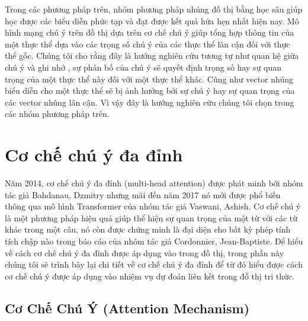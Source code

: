 Trong các phương pháp trên, nhóm phương pháp nhúng đồ thị bằng học sâu giúp học được các biểu diễn phức tạp và đạt được kết quả hứa hẹn nhất hiện nay. Mô hình mạng chú ý trên đồ thị dựa trên cơ chế chú ý giúp tổng hợp thông tin của một thực thể dựa vào các trọng số chú ý của các thực thể lân cận đối với thực thể gốc. Chúng tôi cho rằng đây là hướng nghiên cứu tương tự như quan hệ giữa chú ý và ghi nhớ \cite{memoryandattention:2020}, sự phân bố của chú ý sẽ quyết định trọng số hay sự quan trọng của một thực thể này đối với một thực thể khác. Cũng như vector nhúng biểu diễn cho một thực thể sẽ bị ảnh hưởng bởi sự chú ý hay sự quan trọng của các vector nhúng lân cận. Vì vậy đây là hướng nghiên cứu chúng tôi chọn trong các nhóm phương pháp trên.


\section{Cơ chế chú ý đa đỉnh}

Năm 2014, cơ chế chú ý đa đỉnh (multi-head attention) được phát minh bởi nhóm tác giả Bahdanau, Dzmitry\cite{bahdanau2014neural} nhưng mãi đến năm 2017 nó mới được phổ biến thông qua mô hình Transformer của nhóm tác giả Vaswani, Ashish\cite{vaswani2017attention}. Cơ chế chú ý là một phương pháp hiệu quả giúp thể hiện sự quan trọng của một từ với các từ khác trong một câu, nó còn được chứng minh là đại diện cho bất kỳ phép tính tích chập nào trong báo cáo của nhóm tác giả Cordonnier, Jean-Baptiste\cite{cordonnier2019relationship}. Để hiểu về cách cơ chế chú ý đa đỉnh được áp dụng vào trong đồ thị, trong phần này chúng tôi sẽ trình bày lại chi tiết về cơ chế chú ý đa đỉnh để từ đó hiểu được cách cơ chế chú ý được áp dụng vào nhiệm vụ dự đoán liên kết trong đồ thị tri thức.
%

\subsection{Cơ Chế Chú Ý (Attention Mechanism)}
\label{sec:attentionMechanism}

